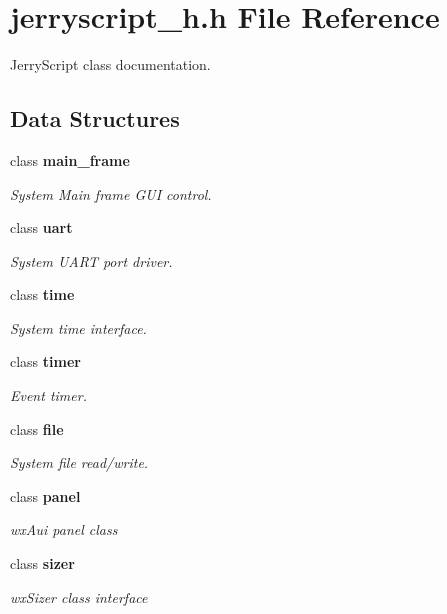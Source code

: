 \section{jerryscript\+\_\+h.\+h File Reference}
\label{jerryscript__h_8h}


Jerry\+Script class documentation.  


\subsection*{Data Structures}
\begin{DoxyCompactItemize}
\item 
class \textbf{ main\+\_\+frame}
\begin{DoxyCompactList}\small\item\em System Main frame G\+UI control. \end{DoxyCompactList}\item 
class \textbf{ uart}
\begin{DoxyCompactList}\small\item\em System U\+A\+RT port driver. \end{DoxyCompactList}\item 
class \textbf{ time}
\begin{DoxyCompactList}\small\item\em System time interface. \end{DoxyCompactList}\item 
class \textbf{ timer}
\begin{DoxyCompactList}\small\item\em Event timer. \end{DoxyCompactList}\item 
class \textbf{ file}
\begin{DoxyCompactList}\small\item\em System file read/write. \end{DoxyCompactList}\item 
class \textbf{ panel}
\begin{DoxyCompactList}\small\item\em wx\+Aui panel class \end{DoxyCompactList}\item 
class \textbf{ sizer}
\begin{DoxyCompactList}\small\item\em wx\+Sizer class interface \end{DoxyCompactList}\item 

\end{DoxyCompactItemize}
